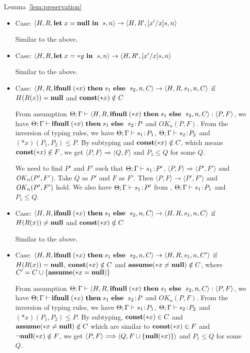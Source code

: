 \begin{pfof}{Lemma~\ref{lem:preservation}}
\begin{itemize}
\item Case: \( \langle H, R, \LET x = \NULL \ \IN \ s, n\rangle
  \rightarrow \langle H, R', [x'/x]s, n \rangle \)

  Similar to the above.

\item Case: \( \langle H, R, \mathbf{let}\; x = *y \ \mathbf{in}\; \ s, n\rangle
  \rightarrow \langle H, R', [x'/x]s, n\rangle \)

  Similar to the above.

\item Case: \(\langle H, R, \IFNULL \Sirx \ \THEN s_{1} \ \ELSE
  \ s_{2}, n, C\rangle \rightarrow \langle H, R, s_{1}, n, C \rangle\)
  if \(H(R(x)) = \mathbf{null}\) and \(\mathbf{const}(*x) \notin C\)

  From assumption \( \Theta; \Gamma \vdash \langle H, R, \mathbf{ifnull}\;(*x)
  \ \mathbf{then}\; s_{1} \ \mathbf{else}\; \ s_{2}, n, C \rangle : \langle P, F
  \rangle\), we have \(\Theta; \Gamma \vdash \mathbf{ifnull}\;(*x) \ \mathbf{then}\;
  s_{1} \ \mathbf{else}\; \ s_{2} \!:\! P \) and \(OK_n(P, F)\). From the
  inversion of typing rules, we have \(\Theta; \Gamma \vdash s_{1}
  \!:\! P_1\), \(\Theta; \Gamma \vdash s_{2} \!:\! P_2\) and \((*x)(P_1,
  P_2) \le P\). By subtyping and \(\mathbf{const}(*x) \notin C\), which means
  \(\mathbf{const}(*x) \notin F\), we get \(\langle P, F \rangle \Longrightarrow
  \langle Q, F \rangle \) and \(P_1 \le Q\) for some \(Q\).

  We need to find \(P'\) and \(F'\) such that \(\Theta;\Gamma \vdash
  s_1\!:\! P'\), \( \langle P, F \rangle \Longrightarrow \langle P', F'
  \rangle\) and \(\mathit{OK}_n(P', F'\)). Take \(Q\) as \(P'\) and \(F\) as
  \(F'\). Then \( \langle P,F \rangle \rightarrow \langle P', F'
  \rangle\) and \(\mathit{OK}_n(P', F')\) hold.  We also have \(\Theta; \Gamma
  \vdash s_1 \!:\! P'\) from , \(\Theta; \Gamma \vdash s_1
  \!:\! P_1\) and \( P_1 \le Q\).

\item Case: \(\langle H, R, \IFNULL \Sirx \ \THEN s_{1} \ \ELSE
  \ s_{2}, n, C\rangle \rightarrow \langle H, R, s_{1}, n, C \rangle\)
  if \(H(R(x)) \neq \mathbf{null}\) and \(\mathbf{const}(*x) \notin C\)

    Similar to the above.
  
\item Case: \(\langle H, R, \IFNULL \Sirx \ \THEN s_{1} \ \ELSE
  \ s_{2}, n, C\rangle \rightarrow \langle H, R, s_{1}, n, C'
  \rangle\) if \(H(R(x)) = \mathbf{null}\), \(\mathbf{const}(*x) \notin C\) and
  \(\mathbf{assume}(*x \ne \mathbf{null}) \notin C\), where \(C' = C \cup \{\mathbf{assume}(*x = \mathbf{null})\}\)

  From assumption \( \Theta; \Gamma \vdash \langle H, R, \mathbf{ifnull}\;(*x)
  \ \mathbf{then}\; s_{1} \ \mathbf{else}\; \ s_{2}, n, C \rangle : \langle P, F
  \rangle\), we have \(\Theta; \Gamma \vdash \mathbf{ifnull}\;(*x) \ \mathbf{then}\;
  s_{1} \ \mathbf{else}\; \ s_{2} \!:\! P \) and \(OK_n(P, F)\). From the
  inversion of typing rules, we have \(\Theta; \Gamma \vdash s_{1}
  \!:\! P_1\), \(\Theta; \Gamma \vdash s_{2} \!:\! P_2\) and \((*x)(P_1,
  P_2) \le P\). By subtyping, \(\mathbf{const}(*x) \in C\) and \(\mathbf{assume}(*x \ne \mathbf{null})
  \notin C\) which are similar to \(\mathbf{const}(*x) \in F\) and \(\neg{\bf null}(*x)
  \notin F\), we get \(\langle P, F \rangle \Longrightarrow \langle Q,
  F\cup \{{\bf null}(*x)\} \rangle \) and \(P_1 \le Q\) for some \(Q\).
  

\end{itemize}
\end{pfof}
